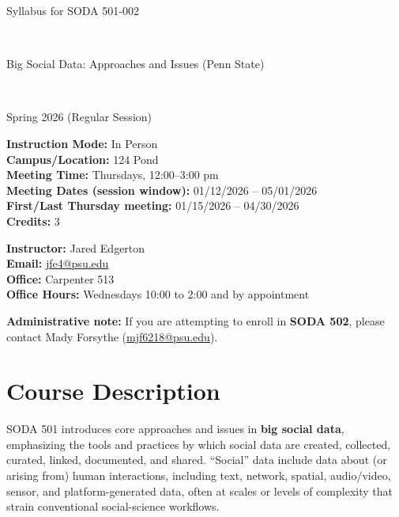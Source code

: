 \documentclass[letterpaper,11pt]{article}
\begin{document}
\begin{center}
\begin{Large} Syllabus for SODA 501-002 \end{Large}\\
\begin{large} Big Social Data: Approaches and Issues (Penn State) \end{large}\\
\begin{large} Spring 2026 (Regular Session) \end{large}
\end{center}

\noindent \textbf{Instruction Mode:} In Person\\
\noindent \textbf{Campus/Location:} 124 Pond\\
\noindent \textbf{Meeting Time:} Thursdays, 12:00--3:00 pm\\
\noindent \textbf{Meeting Dates (session window):} 01/12/2026 -- 05/01/2026 \\
\noindent \textbf{First/Last Thursday meeting:} 01/15/2026 -- 04/30/2026\\
\noindent \textbf{Credits:} 3\\\bigskip

\noindent \textbf{Instructor:} Jared Edgerton\\
\noindent \textbf{Email:} \href{mailto:jfe4@psu.edu}{jfe4@psu.edu}\\
\noindent \textbf{Office:} Carpenter 513
\\
\noindent \textbf{Office Hours:} Wednesdays 10:00 to 2:00 and by appointment\\\medskip

\noindent \textbf{Administrative note:} If you are attempting to enroll in \textbf{SODA 502}, please contact Mady Forsythe (\href{mailto:mjf6218@psu.edu}{mjf6218@psu.edu}).\\

\section*{Course Description}
SODA 501 introduces core approaches and issues in \textbf{big social data}, emphasizing the tools and practices by which social data are created, collected, curated, linked, documented, and shared. ``Social'' data include data about (or arising from) human interactions, including text, network, spatial, audio/video, sensor, and platform-generated data, often at scales or levels of complexity that strain conventional social-science workflows.
\end{document}
